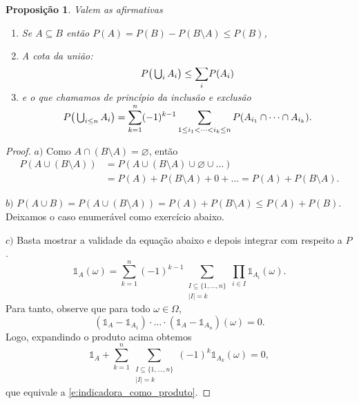 \documentclass[reqno, draft]{book}
\newcommand*\1{\mathds{1}}
\newtheorem{proposition}[theorem]{Proposição}
\DeclareMathOperator*{\mcup}{{\textstyle \bigcup}}
\begin{document}
\begin{proposition}
  Valem as afirmativas
  \begin{enumerate}[\quad a)]
  \item Se $A \subseteq B$ então $P(A) = P(B) - P(B \setminus A) \leq P(B)$,
  \item A cota da união:
    \begin{equation}
      P\big(\mcup\nolimits_i A_i\big) \leq \smash{\sum\limits_i} P(A_i)
    \end{equation}
  \item e o que chamamos de princípio da \emph{inclusão e exclusão} 
    \begin{equation}
      P\big(\mcup\nolimits_{i \leq n} A_i\big) = \smash{\sum\limits_{k = 1}^n} (-1)^{k-1} \sum\limits_{1 \leq i_1 < \dots < i_k \leq n} P(A_{i_1} \cap \dots \cap A_{i_k}).
    \end{equation}
  \end{enumerate}
\end{proposition}

\begin{proof}
  $a)$ Como $A \cap (B \setminus A) = \varnothing$, então
    \begin{equation}
      \begin{split}
        P(A \cup (B \setminus A)) & = P(A \cup (B \setminus A) \cup \varnothing \cup \dots)\\
        & = P(A) + P(B \setminus A) + 0 + \dots = P(A) + P(B \setminus
        A).
      \end{split}
    \end{equation}

  $b)$ $P(A \cup B) = P (A \cup (B \setminus A)) = P(A) + P(B \setminus
    A) \leq P(A) + P(B)$.
    Deixamos o caso enumerável como exercício abaixo.

  $c)$ Basta mostrar a validade da equação abaixo e depois integrar com
    respeito a $P$.
    \begin{equation}
      \label{e:indicadora_como_produto}
      \1_A(\omega) = \sum_{k=1}^n (-1)^{k - 1} \sum_{\substack{I \subseteq \{1, \dots, n\}\\|I| = k}} \prod_{i \in I} \1_{A_i}(\omega).
    \end{equation}
    Para tanto, observe que para todo $\omega \in \Omega$,
    \begin{equation}
      (\1_A - \1_{A_1}) \cdot \dots \cdot (\1_A - \1_{A_n})(\omega) = 0.
    \end{equation}
    Logo, expandindo o produto acima obtemos
    \begin{equation}
      \1_A + \sum_{k = 1}^n \sum_{\substack{I \subseteq \{1, \dots, n\}\\|I| = k}} (-1)^k \1_{A_k}(\omega) = 0,
    \end{equation}
    que equivale a \eqref{e:indicadora_como_produto}.
\end{proof}
\end{document}
